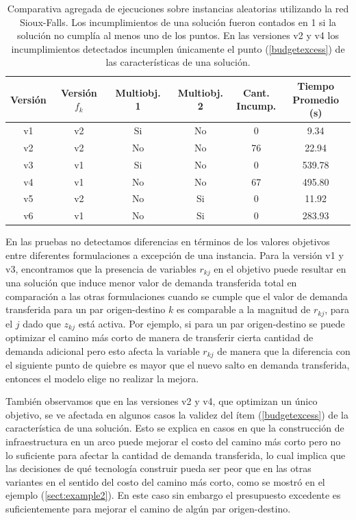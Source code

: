 \documentclass{article}
\begin{document}
  \begin{table}[h!]
    \centering
    \begin{tabular}{cccccc}
      \toprule
      Versión & Versión $f_k$ & Multiobj. 1 & Multiobj. 2 & \shortstack{Cant. \\ Incump.} & \shortstack{Tiempo \\ Promedio (s)} \\
      \midrule
      v1 & v2 & Si & No & 0   & 9.34    \\
      v2 & v2 & No & No & 76  & 22.94   \\
      v3 & v1 & Si & No & 0   & 539.78  \\
      v4 & v1 & No & No & 67  & 495.80  \\
      v5 & v2 & No & Si & 0   & 11.92   \\
      v6 & v1 & No & Si & 0   & 283.93  \\
      \bottomrule
    \end{tabular}
    \caption{Comparativa agregada de ejecuciones sobre instancias aleatorias utilizando la red Sioux-Falls. Los incumplimientos de una solución fueron contados en 1 si la solución no cumplía al menos uno de los puntos. En las versiones v2 y v4 los incumplimientos detectados incumplen únicamente el punto (\ref{budgetexcess}) de las características de una solución.}\label{table:resumenejecuciones}
  \end{table}

  En las pruebas no detectamos diferencias en términos de los valores objetivos entre diferentes formulaciones a excepción de una instancia. Para la versión v1 y v3, encontramos que la presencia de variables $r_{kj}$ en el objetivo puede resultar en una solución que induce menor valor de demanda transferida total en comparación a las otras formulaciones cuando se cumple que el valor de demanda transferida para un par origen-destino $k$ es comparable a la magnitud de $r_{kj}$, para el $j$ dado que $z_{kj}$ está activa. Por ejemplo, si para un par origen-destino se puede optimizar el camino más corto de manera de transferir cierta cantidad de demanda adicional pero esto afecta la variable $r_{kj}$ de manera que la diferencia con el siguiente punto de quiebre es mayor que el nuevo salto en demanda transferida, entonces el modelo elige no realizar la mejora.

  También observamos que en las versiones v2 y v4, que optimizan un único objetivo, se ve afectada en algunos casos la validez del ítem (\ref{budgetexcess}) de la característica de una solución. Esto se explica en casos en que la construcción de infraestructura en un arco puede mejorar el costo del camino más corto pero no lo suficiente para afectar la cantidad de demanda transferida, lo cual implica que las decisiones de qué tecnología construir pueda ser peor que en las otras variantes en el sentido del costo del camino más corto, como se mostró en el ejemplo (\ref{sect:example2}). En este caso sin embargo el presupuesto excedente es suficientemente para mejorar el camino de algún par origen-destino.
\end{document}

